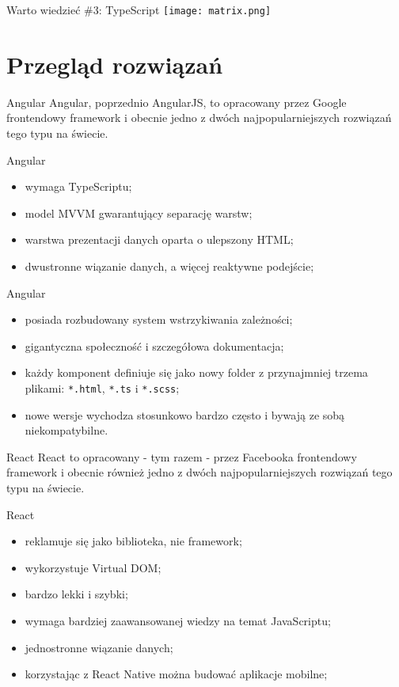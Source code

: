 \begin{frame}{Warto wiedzieć \#3: TypeScript}
	\centering
	\texttt{[image: matrix.png]}
\end{frame}

\section{Przegląd rozwiązań}

\begin{frame}{Angular}
	Angular, poprzednio AngularJS, to opracowany przez Google frontendowy framework i obecnie jedno z dwóch najpopularniejszych rozwiązań tego typu na świecie.
\end{frame}

\begin{frame}{Angular}
	\begin{itemize}
	\item wymaga TypeScriptu;
	\item model MVVM gwarantujący separację warstw;
	\item warstwa prezentacji danych oparta o ulepszony HTML;
	\item dwustronne wiązanie danych, a więcej reaktywne podejście;
	\end{itemize}
\end{frame}

\begin{frame}{Angular}
	\begin{itemize}
	\item posiada rozbudowany system wstrzykiwania zależności;
	\item gigantyczna społeczność i szczegółowa dokumentacja;
	\item każdy komponent definiuje się jako nowy folder z przynajmniej trzema plikami: \texttt{*.html},  \texttt{*.ts} i  \texttt{*.scss};
	\item nowe wersje wychodza stosunkowo bardzo często i bywają ze sobą niekompatybilne.
	\end{itemize}
\end{frame}

\begin{frame}{React}
	React to opracowany - tym razem - przez Facebooka frontendowy framework i obecnie również jedno z dwóch najpopularniejszych rozwiązań tego typu na świecie.
\end{frame}

\begin{frame}{React}
	\begin{itemize}
	\item reklamuje się jako biblioteka, nie framework;
	\item wykorzystuje Virtual DOM;
	\item bardzo lekki i szybki;
	\item wymaga bardziej zaawansowanej wiedzy na temat JavaScriptu;
	\item jednostronne wiązanie danych;
	\item korzystając z React Native można budować aplikacje mobilne;
	\end{itemize}
\end{frame}

